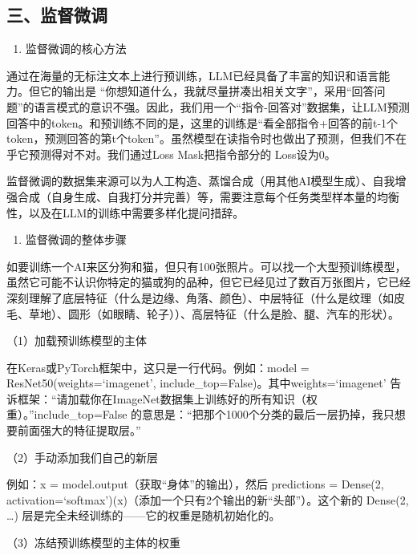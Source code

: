 \hypertarget{ux4e09ux76d1ux7763ux5faeux8c03}{%
\subsection{三、监督微调}\label{ux4e09ux76d1ux7763ux5faeux8c03}}

\begin{enumerate}
\def\labelenumi{\arabic{enumi}.}
\tightlist
\item
  监督微调的核心方法
\end{enumerate}

通过在海量的无标注文本上进行预训练，LLM已经具备了丰富的知识和语言能力。但它的输出是 ``你想知道什么，我就尽量拼凑出相关文字''，采用``回答问题''的语言模式的意识不强。因此，我们用一个``指令-回答对''数据集，让LLM预测回答中的token。和预训练不同的是，这里的训练是``看全部指令+回答的前t-1个token，预测回答的第t个token''。虽然模型在读指令时也做出了预测，但我们不在乎它预测得对不对。我们通过Loss Mask把指令部分的 Loss设为0。

监督微调的数据集来源可以为人工构造、蒸馏合成（用其他AI模型生成）、自我增强合成（自身生成、自我打分并完善）等，需要注意每个任务类型样本量的均衡性，以及在LLM的训练中需要多样化提问措辞。

\begin{enumerate}
\def\labelenumi{\arabic{enumi}.}
\setcounter{enumi}{1}
\tightlist
\item
  监督微调的整体步骤
\end{enumerate}

如要训练一个AI来区分狗和猫，但只有100张照片。可以找一个大型预训练模型，虽然它可能不认识你特定的猫或狗的品种，但它已经见过了数百万张图片，它已经深刻理解了底层特征（什么是边缘、角落、颜色）、中层特征（什么是纹理（如皮毛、草地）、圆形（如眼睛、轮子））、高层特征（什么是脸、腿、汽车的形状）。

（1）加载预训练模型的主体

在Keras或PyTorch框架中，这只是一行代码。例如：model = ResNet50(weights=`imagenet', include\_top=False)。其中weights=`imagenet' 告诉框架：``请加载你在ImageNet数据集上训练好的所有知识（权重）。''include\_top=False 的意思是：``把那个1000个分类的最后一层扔掉，我只想要前面强大的特征提取层。''

（2）手动添加我们自己的新层

例如：x = model.output（获取``身体''的输出），然后 predictions = Dense(2, activation=`softmax')(x)（添加一个只有2个输出的新``头部''）。这个新的 Dense(2, \ldots) 层是完全未经训练的------它的权重是随机初始化的。

（3）冻结预训练模型的主体的权重

